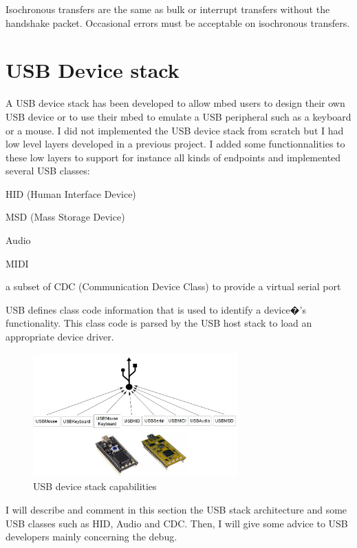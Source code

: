 \documentclass[pdftex,10pt,a4paper]{report}
\newenvironment{packed_item}{
\begin{itemize}
  \setlength{\itemsep}{1pt}
  \setlength{\parskip}{0pt}
  \setlength{\parsep}{0pt}
}{\end{itemize}}
\begin{document}
Isochronous transfers are the same as bulk or interrupt transfers without the handshake packet. Occasional errors must be acceptable on isochronous transfers.



\newpage
\section{USB Device stack}
A USB device stack has been developed to allow mbed users to design their own USB device or to use their mbed to emulate a USB peripheral such as a keyboard or a mouse. I did not implemented the USB device stack from scratch but I had low level layers developed in a previous project. I added some functionnalities to these low layers to support for instance all kinds of endpoints and implemented several USB classes:
\begin{packed_item}
	\item HID (Human Interface Device)
	\item MSD (Mass Storage Device)
	\item Audio
	\item MIDI
	\item a subset of CDC (Communication Device Class) to provide a virtual serial port
\end{packed_item}

USB defines class code information that is used to identify a device�'s functionality. This class code is parsed by the USB host stack to load an appropriate device driver.

\begin{figure}[h!]
		\centering
		\includegraphics[width=0.7\textwidth]{./usb_capa1.jpg}
		\caption{USB device stack capabilities}
		\label{USB device stack capabilities}
\end{figure}

I will describe and comment in this section the USB stack architecture and some USB classes such as HID, Audio and CDC. Then, I will give some advice to USB developers mainly concerning the debug.
\end{document}
